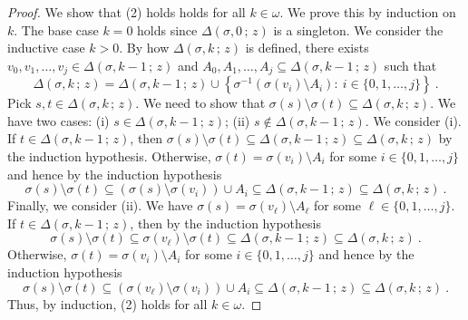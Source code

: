 \documentclass[10pt,a4paper]{amsart}
\begin{document}
\begin{proof}
We show that (2) holds   holds for all $ k   \in  \omega   $. 
We prove this by induction on $k$. 
The base case $k= 0 $  holds since   $   \Delta \left(  \sigma , 0  \,  ;   \,   z  \right)   $  is a singleton. 
We consider the inductive case  $  k >  0  $. 
By how  $   \Delta \left(  \sigma , k  \,  ;   \,   z  \right)   $  is defined,  there exists 
 $  v_0,  v_1,  \ldots ,  v_j  \in   \Delta \left(  \sigma , k-1  \,  ;   \,   z  \right)    $  
 and  $  A_0,  A_1,  \ldots , A_j  \subseteq    \Delta \left(  \sigma , k-1  \,  ;   \,   z  \right)  $  such that  
 \[
 \Delta \left(  \sigma , k  \,  ;   \,   z  \right)  =   \Delta \left(  \sigma , k-1  \,  ;   \,   z  \right)     \cup   
 \left\{
     \sigma^{ -1}   \left(      \sigma ( v_i )  \setminus   A_i   \right)     :    \     i  \in  \lbrace 0, 1,  \ldots  ,  j  \rbrace 
 \right\}
 \      .
 \]
Pick  $  s,  t   \in  \Delta \left(  \sigma , k  \,  ;   \,   z  \right) $.
We need to show that 
 $  \sigma (s)  \setminus  \sigma (t)   \subseteq       \Delta \left(  \sigma , k   \,  ;   \,   z  \right)    $.
 We have two cases:
  (i)  $  s  \in   \Delta \left(  \sigma , k-1  \,  ;   \,   z  \right) $; 
  (ii)  $  s  \not\in   \Delta \left(  \sigma , k-1  \,  ;   \,   z  \right) $. 
  We consider (i). 
  If  $  t  \in   \Delta \left(  \sigma , k-1  \,  ;   \,   z  \right)   $, 
  then   $  \sigma (s)  \setminus  \sigma (t)    \subseteq   \Delta \left(  \sigma , k-1  \,  ;   \,   z  \right)    \subseteq       \Delta \left(  \sigma , k   \,  ;   \,   z  \right)    $
  by the induction hypothesis. 
  Otherwise, $   \sigma (t)  =    \sigma ( v_i )  \setminus   A_i   $  for some  $  i  \in    \lbrace 0, 1,  \ldots  ,  j  \rbrace   $ 
  and hence  by the induction hypothesis 
  \[
    \sigma (s)  \setminus  \sigma (t)        \subseteq   
    \left(       \sigma (s)  \setminus \sigma ( v_i )       \right)    \cup  A_i 
    \subseteq   \Delta \left(  \sigma , k-1  \,  ;   \,   z  \right)    \subseteq       \Delta \left(  \sigma , k   \,  ;   \,   z  \right)  
    \      .
  \]
Finally,  we consider (ii). 
We have  $  \sigma (s)  =    \sigma ( v_{  \ell}   )  \setminus   A_{  \ell  }   $  for some  $  \ell  \in    \lbrace 0, 1,  \ldots  ,  j  \rbrace   $. 
If  $  t   \in    \Delta \left(  \sigma , k-1  \,  ;   \,   z  \right)   $,  then    by the induction hypothesis 
  \[
    \sigma (s)  \setminus  \sigma (t)        \subseteq        \sigma ( v_{  \ell}   )   \setminus \sigma ( t )    
    \subseteq   \Delta \left(  \sigma , k-1  \,  ;   \,   z  \right)    \subseteq       \Delta \left(  \sigma , k   \,  ;   \,   z  \right)  
    \      .
  \]
Otherwise,   $   \sigma (t)  =    \sigma ( v_i )  \setminus   A_i   $  for some  $  i  \in    \lbrace 0, 1,  \ldots  ,  j  \rbrace   $ 
  and hence  by the induction hypothesis 
  \[
    \sigma (s)  \setminus  \sigma (t)        \subseteq       
    \left(   \sigma ( v_{  \ell}   )   \setminus  \sigma ( v_i )      \right)    \cup   A_i 
    \subseteq   \Delta \left(  \sigma , k-1  \,  ;   \,   z  \right)    \subseteq       \Delta \left(  \sigma , k   \,  ;   \,   z  \right)  
    \      .
  \]  
Thus, by induction,  (2)  holds for all $ k  \in  \omega  $. 






\end{proof}
\end{document}
